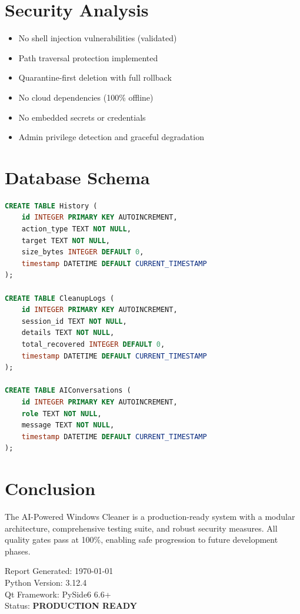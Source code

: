 \documentclass[11pt,a4paper]{article}
\begin{document}
\section{Security Analysis}

\begin{tcolorbox}[colback=blue!5!white,colframe=blue!70!black,title=Security Posture]
\begin{itemize}
    \item No shell injection vulnerabilities (validated)
    \item Path traversal protection implemented
    \item Quarantine-first deletion with full rollback
    \item No cloud dependencies (100\% offline)
    \item No embedded secrets or credentials
    \item Admin privilege detection and graceful degradation
\end{itemize}
\end{tcolorbox}

\section{Database Schema}

\begin{lstlisting}[language=SQL,caption={SQLite Schema}]
CREATE TABLE History (
    id INTEGER PRIMARY KEY AUTOINCREMENT,
    action_type TEXT NOT NULL,
    target TEXT NOT NULL,
    size_bytes INTEGER DEFAULT 0,
    timestamp DATETIME DEFAULT CURRENT_TIMESTAMP
);

CREATE TABLE CleanupLogs (
    id INTEGER PRIMARY KEY AUTOINCREMENT,
    session_id TEXT NOT NULL,
    details TEXT NOT NULL,
    total_recovered INTEGER DEFAULT 0,
    timestamp DATETIME DEFAULT CURRENT_TIMESTAMP
);

CREATE TABLE AIConversations (
    id INTEGER PRIMARY KEY AUTOINCREMENT,
    role TEXT NOT NULL,
    message TEXT NOT NULL,
    timestamp DATETIME DEFAULT CURRENT_TIMESTAMP
);
\end{lstlisting}

\section{Conclusion}

The AI-Powered Windows Cleaner is a production-ready system with a modular architecture, comprehensive testing suite, and robust security measures. All quality gates pass at 100\%, enabling safe progression to future development phases.

\begin{tcolorbox}[colback=gray!5!white,colframe=gray!70!black,title=Report Metadata]
Report Generated: \today \\
Python Version: 3.12.4 \\
Qt Framework: PySide6 6.6+ \\
Status: \textbf{PRODUCTION READY}
\end{tcolorbox}
\end{document}
